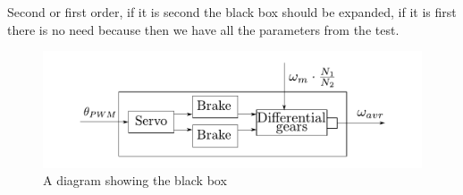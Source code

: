 Second or first order, if it is second the black box should be expanded, if it is first there is no need because then we have all the parameters from the test.
 
\begin{figure}[H]
	\centering
	\includegraphics[scale=1]{figures/steeringDiagramBlackBox.pdf}
	\caption{A diagram showing the black box}
	\label{steeringDiagramBlackBox}
\end{figure}
 
 
